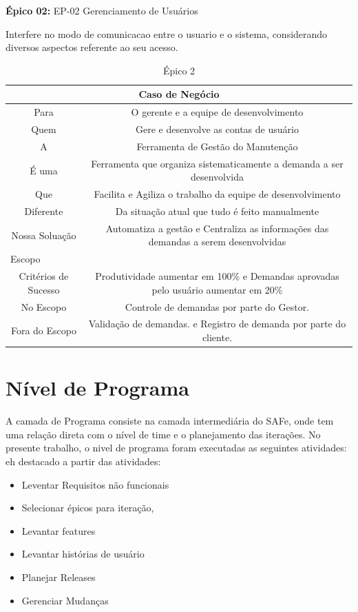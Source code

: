 \textbf{Épico 02:} EP-02 Gerenciamento de Usuários

Interfere no modo de comunicacao entre o usuario e o sistema, considerando diversos aspectos referente ao seu acesso.

\begin{table}[H]
\centering
\caption{Épico 2}
\label{epic:segundo}
\begin{tabular}{|c|c|}
\hline
\multicolumn{2}{|m{4cm}|}{\textbf{Caso de Negócio}} \\ \hline
  Para   &   O gerente e a equipe de desenvolvimento        \\ \hline
  Quem         &    Gere e desenvolve as contas de usuário        \\ \hline
    A       &     Ferramenta de Gestão do Manutenção    \\ \hline
      É uma     &    Ferramenta que organiza sistematicamente a demanda a ser desenvolvida \\ \hline
      Que     &     Facilita e Agiliza o trabalho da equipe de desenvolvimento \\ \hline
      Diferente   &     Da situação atual que tudo é feito manualmente     \\ \hline
      Nossa Soluação  &   Automatiza a gestão e Centraliza as informações das demandas a serem desenvolvidas    \\ \hline
\multicolumn{2}{|l|}{Escopo} \\ \hline
Critérios de Sucesso  &  Produtividade aumentar em 100\% e Demandas aprovadas pelo usuário aumentar em 20\%    \\ \hline
No Escopo & Controle de demandas por parte do Gestor. \\ \hline
Fora do Escopo  & Validação de demandas. e Registro de demanda por parte do cliente.     \\ \hline
\end{tabular}
\end{table}

\section{Nível de Programa}

A camada de Programa consiste na camada intermediária do SAFe, onde tem uma relação
direta com o nível de time e o planejamento das iterações. No presente trabalho,
o nivel de programa foram executadas as seguintes atividades: eh destacado a partir das atividades:

\begin{itemize}
  \item Leventar Requisitos não funcionais
  \item Selecionar épicos para iteração,
  \item Levantar features
  \item Levantar histórias de usuário
  \item Planejar Releases
  \item Gerenciar Mudanças
\end{itemize}


